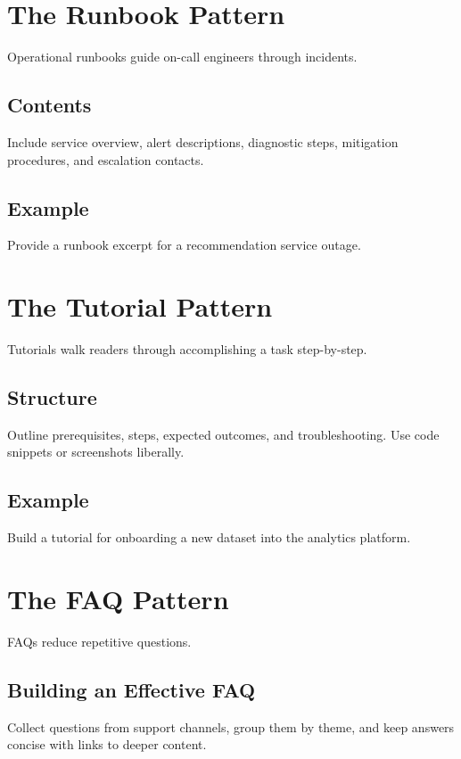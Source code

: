 \section{The Runbook Pattern}
\label{sec:runbook}

Operational runbooks guide on-call engineers through incidents.

\subsection{Contents}
Include service overview, alert descriptions, diagnostic steps, mitigation procedures, and escalation contacts.

\subsection{Example}
Provide a runbook excerpt for a recommendation service outage.

\section{The Tutorial Pattern}
\label{sec:tutorial}

Tutorials walk readers through accomplishing a task step-by-step.

\subsection{Structure}
Outline prerequisites, steps, expected outcomes, and troubleshooting. Use code snippets or screenshots liberally.

\subsection{Example}
Build a tutorial for onboarding a new dataset into the analytics platform.

\section{The FAQ Pattern}
\label{sec:faq}

FAQs reduce repetitive questions.

\subsection{Building an Effective FAQ}
Collect questions from support channels, group them by theme, and keep answers concise with links to deeper content.

